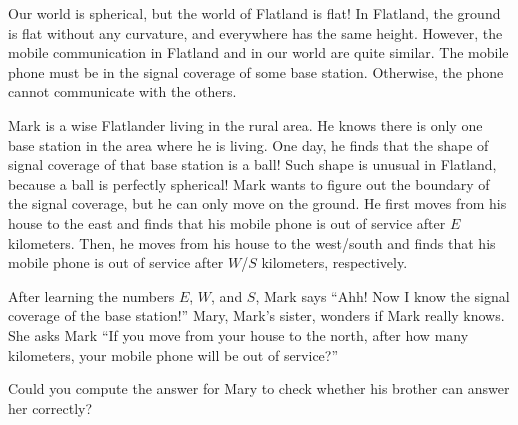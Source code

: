 Our world is spherical, but the world of Flatland is flat! 
In Flatland, the ground is flat without any curvature, 
and everywhere has the same height.
However, the mobile communication in Flatland and in our world are quite 
similar.
The mobile phone must be in the signal coverage of some base station.
Otherwise, the phone cannot communicate with the others.

Mark is a wise Flatlander living in the rural area.
He knows there is only one base station in the area where he is living.
One day, he finds that
the shape of signal coverage of that base station is a ball!
Such shape is unusual in Flatland, because a ball is perfectly spherical!
Mark wants to figure out the boundary of the signal coverage, 
but he can only move on the ground.
He first moves from his house to the east and finds that his mobile phone is out of service
after $E$ kilometers. 
Then, he moves from his house to the west/south and finds that his mobile phone is out of 
service after $W$/$S$ kilometers, respectively.

After learning the numbers $E$, $W$, and $S$, 
Mark says ``Ahh! Now I know the signal coverage of the base station!''
Mary, Mark's sister, wonders if Mark really knows. 
She asks Mark ``If you move from your house to the north, after how many 
kilometers, your mobile phone will be out of service?''

Could you compute the answer for Mary to check whether his brother can
answer her correctly? 
